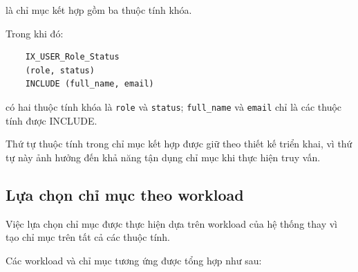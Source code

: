 là chỉ mục kết hợp gồm ba thuộc tính khóa.

Trong khi đó:

\begin{verbatim}
	IX_USER_Role_Status
	(role, status)
	INCLUDE (full_name, email)
\end{verbatim}

có hai thuộc tính khóa là \texttt{role} và \texttt{status}; 
\texttt{full\_name} và \texttt{email} chỉ là các thuộc tính được INCLUDE.

Thứ tự thuộc tính trong chỉ mục kết hợp được giữ theo thiết kế triển khai,
vì thứ tự này ảnh hưởng đến khả năng tận dụng chỉ mục khi thực hiện truy
vấn.

\subsection{Lựa chọn chỉ mục theo workload}

Việc lựa chọn chỉ mục được thực hiện dựa trên workload của hệ thống thay vì
tạo chỉ mục trên tất cả các thuộc tính.

Các workload và chỉ mục tương ứng được tổng hợp như sau:

